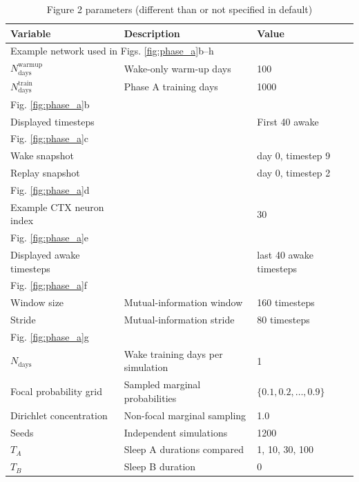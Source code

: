 \documentclass{article}
\begin{document}
\begin{table}[ht]
\centering
\caption{Figure 2 parameters (different than or not specified in default)}
\label{tab:figure_2}
\begin{tabular}{lll}
\toprule
\textbf{Variable} & \textbf{Description} & \textbf{Value} \\
\midrule
\multicolumn{3}{l}{Example network used in Figs. \ref{fig:phase_a}b--h} \\
$N_\textrm{days}^\textrm{warmup}$ & Wake-only warm-up days & 100 \\
$N_\textrm{days}^\textrm{train}$ & Phase A training days & 1000 \\
\midrule
\multicolumn{3}{l}{Fig. \ref{fig:phase_a}b} \\
Displayed timesteps &  & First 40 awake \\
\midrule
\multicolumn{3}{l}{Fig. \ref{fig:phase_a}c} \\
Wake snapshot &  & day 0, timestep 9 \\
Replay snapshot &  & day 0, timestep 2 \\
\midrule
\multicolumn{3}{l}{Fig. \ref{fig:phase_a}d} \\
Example CTX neuron index &  & 30 \\
\midrule
\multicolumn{3}{l}{Fig. \ref{fig:phase_a}e} \\
Displayed awake timesteps &  & last 40 awake timesteps \\
\midrule
\multicolumn{3}{l}{Fig. \ref{fig:phase_a}f} \\
Window size & Mutual-information window & 160 timesteps \\
Stride & Mutual-information stride & 80 timesteps \\
\midrule
\multicolumn{3}{l}{Fig. \ref{fig:phase_a}g} \\
$N_\textrm{days}$ & Wake training days per simulation & 1 \\
Focal probability grid & Sampled marginal probabilities & $\{0.1,0.2,\dots,0.9\}$ \\
Dirichlet concentration & Non-focal marginal sampling & 1.0 \\
Seeds & Independent simulations & 1200 \\
$T_A$ & Sleep A durations compared & 1, 10, 30, 100 \\
$T_B$ & Sleep B duration & 0 \\
\bottomrule
\end{tabular}
\end{table}
\end{document}

